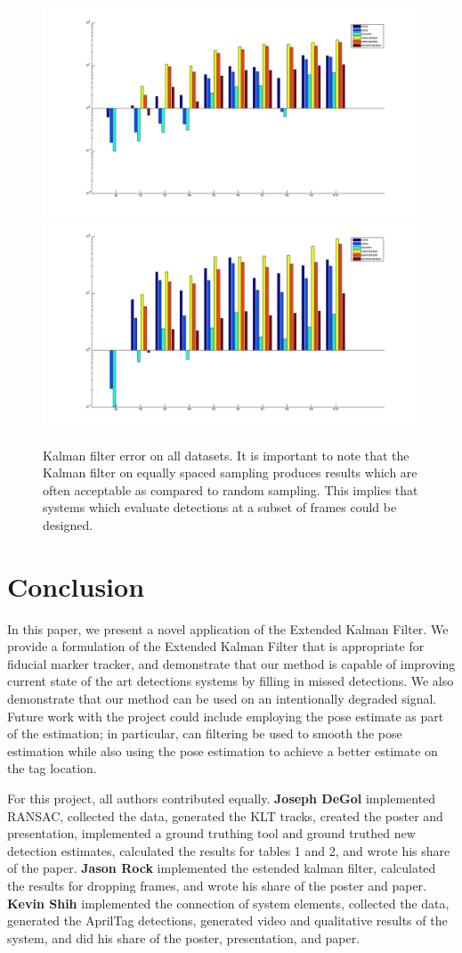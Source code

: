 \documentclass[12pt]{article}
\begin{document}
\begin{figure}[h]
\includegraphics[width=.5\textwidth]{kalman_dec_2.png}
\includegraphics[width=.5\textwidth]{kalman_dec_3.png}
\caption{Kalman filter error on all datasets.  It is important to note that the Kalman filter on equally spaced sampling produces results which are often acceptable as compared to  random sampling. This implies that systems which evaluate detections at a subset of frames could be designed.}
\label{fig:kalman_error}
\end{figure}

\section{Conclusion}
\label{sec:conclusion}
In this paper, we present a novel application of the Extended Kalman Filter. We provide a formulation of the Extended Kalman Filter that is appropriate for fiducial marker tracker, and demonstrate that our method is capable of improving current state of the art detections systems by filling in missed detections. We also demonstrate that our method can be used on an intentionally degraded signal. Future work with the project could include employing the pose estimate as part of the estimation; in particular, can filtering be used to smooth the pose estimation while also using the pose estimation to achieve a better estimate on the tag location.

For this project, all authors contributed equally.
\textbf{Joseph DeGol} implemented RANSAC, collected the data, generated the KLT tracks, created the poster and presentation, implemented a ground truthing tool and ground truthed new detection estimates, calculated the results for tables 1 and 2, and wrote his share of the paper. \textbf{Jason Rock} implemented the estended kalman filter, calculated the results for dropping frames, and wrote his share of the poster and paper. \textbf{Kevin Shih} implemented the connection of system elements, collected the data, generated the AprilTag detections, generated video and qualitative results of the system, and did his share of the poster, presentation, and paper.



\end{document}
